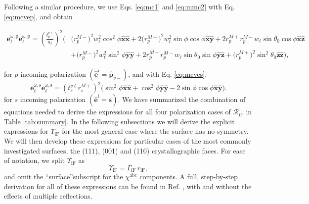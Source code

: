 \documentclass[aps,prb,10pt,showpacs,letterpaper,twocolumn]{revtex4-1}
\begin{document}
Following a similar procedure, we use Eqs. \eqref{eq:mc1} and \eqref{eq:mmc2}
with Eq. \eqref{eq:mcvep}, and obtain
\begin{widetext}
\begin{equation}\label{eq:ewewpmr}
\begin{split}
\mathbf{e}^{\omega,\mathrm{p}}_{\ell}\mathbf{e}^{\omega,\mathrm{p}}_{\ell} =
\left(\frac{t^{v\ell}_{p}}{n_{\ell}}\right)^{2}
\bigg(
 &\big(r^{M-}_{p}\big)^{2}w^{2}_{\ell}\cos^{2}\phi
  \hat{\mathbf{x}}\hat{\mathbf{x}}
+ 2\big(r^{M-}_{p}\big)^{2}w^{2}_{\ell}\sin\phi\cos\phi
  \hat{\mathbf{x}}\hat{\mathbf{y}}
+ 2r^{M+}_{p}r^{M-}_{p}w_{\ell}\sin\theta_{0}\cos\phi
  \hat{\mathbf{x}}\hat{\mathbf{z}}\\
&+ \big(r^{M-}_{p}\big)^{2}w^{2}_{\ell}\sin^{2}\phi
  \hat{\mathbf{y}}\hat{\mathbf{y}}
+ 2r^{M+}_{p}r^{M-}_{p}w_{\ell}\sin\theta_{0}\sin\phi
  \hat{\mathbf{y}}\hat{\mathbf{z}}
+ \big(r^{M+}_{p}\big)^{2}\sin^{2}\theta_{0}
   \hat{\mathbf{z}}\hat{\mathbf{z}}
\bigg),
\end{split}
\end{equation}
\end{widetext}
for $p$ incoming polarization $(\hat{\mathbf{e}}^{\mathrm{i}} =
\hat{\mathbf{p}}_{v-})$, and with Eq. \eqref{eq:mcves},
\begin{equation}\label{eq:ewewsmr}
\mathbf{e}^{\omega,\mathrm{s}}_{\ell}\mathbf{e}^{\omega,\mathrm{s}}_{\ell}
= \left(t^{v\ell}_{s}r^{M+}_{s}\right)^{2}
\big(
  \sin^{2}\phi\hat{\mathbf{x}}\hat{\mathbf{x}}
 + \cos^{2}\phi\hat{\mathbf{y}}\hat{\mathbf{y}}
 - 2\sin\phi\cos\phi\hat{\mathbf{x}}\hat{\mathbf{y}}
\big).
\end{equation}
for $s$ incoming polarization $(\hat{\mathbf{e}}^{\mathrm{i}} =
\hat{\mathbf{s}})$. We have summarized the combination of equations needed to
derive the expressions for all four polarization cases of
$\mathcal{R}_{\mathrm{iF}}$ in Table \ref{tab:summary}. In the following
subsections we will derive the explicit expressions for $\Upsilon_{\mathrm{iF}}$
for the most general case where the surface has no symmetry. We will then
develop these expressions for particular cases of the most commonly investigated
surfaces, the (111), (001) and (110) crystallographic faces. For ease of
{\color{red}
notation, we split $\Upsilon_{\mathrm{iF}}$ as
\begin{equation}\label{eq:mc25}
\Upsilon_{\mathrm{iF}} = \Gamma_{\mathrm{iF}}\,r_{\mathrm{iF}},
\end{equation}
and omit the ``surface''subscript for the $\chi^{\mathrm{abc}}$ components. A
full, step-by-step derivation for all of these expressions can be found in Ref.
, with and without the effects of multiple
reflections.
}
\end{document}

